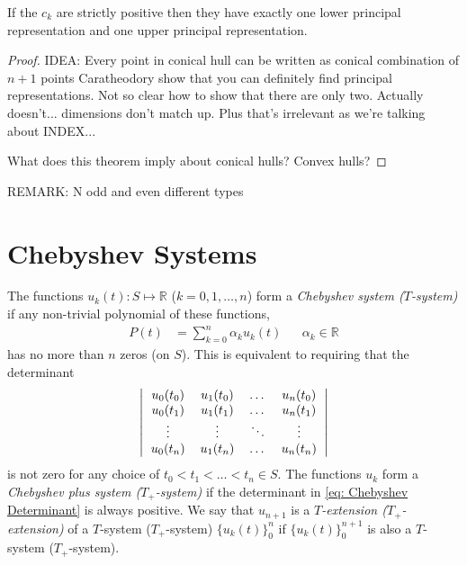 \begin{theorem}
	If the $c_k$ are strictly positive then they have exactly one lower principal representation and one upper principal representation.
	\label{thm: Unique LPR and UPR}
\end{theorem}
\begin{proof}
	IDEA: Every point in conical hull can be written as conical combination of $n+1$ points
	Caratheodory show that you can definitely find principal representations. Not so clear how to show that there are only two. Actually doesn't... dimensions don't match up. Plus that's irrelevant as we're talking about INDEX...
	
	What does this theorem imply about conical hulls? Convex hulls?
\end{proof}

REMARK: N odd and even different types

\section{Chebyshev Systems}
The functions $u_k(t): S \mapsto \mathbb{R}$ ($k = 0,1,\dots,n$) form a \emph{Chebyshev system ($T$-system)} if any non-trivial polynomial of these functions,
\begin{align}
P(t) &= \sum_{k=0}^n \alpha_k u_k(t) &&\alpha_k \in \mathbb{R}
\label{eq: Chebyshev Polynomial}
\end{align}
has no more than $n$ zeros (on $S$). This is equivalent to requiring that the determinant
\begin{equation}
\left| \begin{tabular}{cccc}
$u_0(t_0)$ & $u_1(t_0)$ &\dots & $u_n(t_0)$\\
$u_0(t_1)$ & $u_1(t_1)$ &\dots & $u_n(t_1)$\\
\vdots & \vdots & $\ddots$ & \vdots\\
$u_0(t_n)$ & $u_1(t_n)$ &\dots & $u_n(t_n)$
\end{tabular}\right|
\label{eq: Chebyshev Determinant}
\end{equation}
is not zero for any choice of $t_0 < t_1 < \dots < t_n \in S$. The functions $u_k$ form a \emph{Chebyshev plus system ($T_+$-system)} if the determinant in \eqref{eq: Chebyshev Determinant} is always positive. We say that $u_{n+1}$ is a \emph{$T$-extension ($T_+$-extension)} of a $T$-system ($T_+$-system) $\{u_k(t)\}_0^n$ if $\{u_k(t)\}_0^{n+1}$ is also a $T$-system ($T_+$-system).

